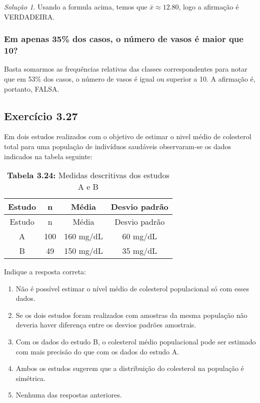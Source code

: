 \documentclass[
]{latex/krantz}
\providecommand{\tightlist}{%
  \setlength{\itemsep}{0pt}\setlength{\parskip}{0pt}}
\theoremstyle{definition}
\theoremstyle{definition}
\theoremstyle{definition}
\theoremstyle{definition}
\theoremstyle{remark}
\newtheorem*{solution}{Solução}
\begin{document}
\begin{solution}
Usando a formula acima, temos que \(\bar{x} \approx 12.80\), logo a afirmação é VERDADEIRA.

\hypertarget{em-apenas-35-dos-casos-o-nuxfamero-de-vasos-uxe9-maior-que-10}{%
\subsubsection*{Em apenas 35\% dos casos, o número de vasos é maior que 10?}\label{em-apenas-35-dos-casos-o-nuxfamero-de-vasos-uxe9-maior-que-10}}

Basta somarmos as frequências relativas das classes correspondentes para notar que em 53\% dos casos, o número de vasos é igual ou superior a 10. A afirmação é, portanto, FALSA.

\end{solution}

\hypertarget{exr3-27}{%
\subsection*{Exercício 3.27}\label{exr3-27}}

Em dois estudos realizados com o objetivo de estimar o nivel médio de colesterol total para uma população de indivíduos saudáveis observaram-se os dados indicados na tabela seguinte:

\begin{longtable}[]{@{}cccc@{}}
\caption{\textbf{Tabela 3.24:} Medidas descritivas dos estudos A e B}\tabularnewline
\toprule\noalign{}
Estudo & n & Média & Desvio padrão \\
\midrule\noalign{}
\endfirsthead
\toprule\noalign{}
Estudo & n & Média & Desvio padrão \\
\midrule\noalign{}
\endhead
\bottomrule\noalign{}
\endlastfoot
A & 100 & 160 mg/dL & 60 mg/dL \\
B & 49 & 150 mg/dL & 35 mg/dL \\
\end{longtable}

Indique a resposta correta:

\begin{enumerate}
\def\labelenumi{\alph{enumi})}
\tightlist
\item
  Não é possível estimar o nível médio de colesterol populacional só com esses dados.
\item
  Se os dois estudos foram realizados com amostras da mesma população não deveria haver diferença entre os desvios padrões amostrais.
\item
  Com os dados do estudo B, o colesterol médio populacional pode ser estimado com mais precisão do que com os dados do estudo A.
\item
  Ambos os estudos sugerem que a distribuição do colesterol na população é simétrica.
\item
  Nenhuma das respostas anteriores.
\end{enumerate}
\end{document}
